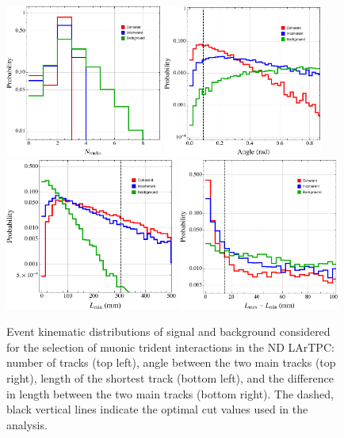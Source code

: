 \begin{figure}[!tb]
\centering
\includegraphics[height=5cm]{graphics/NTracksHistogram.pdf}
\includegraphics[height=5cm]{graphics/AngleHistogram.pdf} \\[0.75\baselineskip]
\includegraphics[height=5cm]{graphics/LengthHistogram.pdf}
\includegraphics[height=5cm]{graphics/DeltaLHistogram.pdf}
\caption{Event kinematic distributions of signal and background considered for the selection of muonic trident interactions in the ND LArTPC: number of tracks (top left), angle between the two main tracks (top right), length of the shortest track (bottom left), and the difference in length between the two main tracks (bottom right). The dashed, black vertical lines indicate the optimal cut values used in the analysis.} \label{fig:trident_kinematics}
\end{figure}

